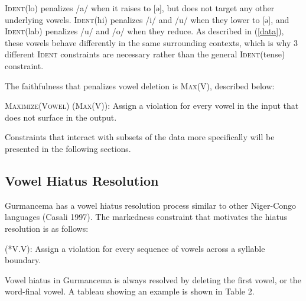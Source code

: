 \documentclass[output=paper,
modfonts
]{langscibook}
\begin{document}
 \textsc{Ident}(lo) penalizes /a/ when it raises to [ə], but does not target any other underlying vowels. \textsc{Ident}(hi) penalizes /i/ and /u/ when they lower to [ə], and \textsc{Ident}(lab) penalizes /u/ and /o/ when they reduce. As described in (\ref{data}), these vowels behave differently in the same surrounding contexts, which is why 3 different \textsc{Ident} constraints are necessary rather than the general \textsc{Ident}(tense) constraint. 
 
The faithfulness that penalizes vowel deletion is \textsc{Max}(V), described below:
  
\ea
\textsc{Maximize(Vowel)} (\textsc{Max(V)}): Assign a violation for every vowel in the input 	that does not surface in the output. 
\z

Constraints that interact with subsets of the data more specifically will be 
presented in the following sections. 

\subsection{Vowel Hiatus Resolution}

Gurmancema has a vowel hiatus resolution process similar to other Niger-Congo languages (Casali 1997). 
The markedness constraint that motivates the hiatus resolution is as follows:

\ea
 (*V.V): Assign a violation for every sequence of vowels across a syllable 	boundary. 
\z
  
  Vowel hiatus in Gurmancema is always resolved by deleting the first vowel, or 
  the word-final vowel. A tableau showing an example is shown in Table 2.
  
\end{document}

